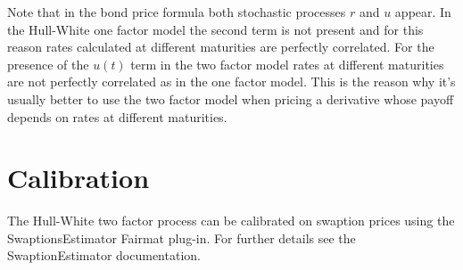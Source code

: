 Note that in the bond price formula both stochastic processes $r$ and $u$ appear. In the Hull-White one factor model the second term is not present and for this reason rates calculated at different maturities are perfectly correlated. For the presence of the $u(t)$ term in the two factor model rates at different maturities are not perfectly correlated as in the one factor model. This is the reason why it's usually better to use the two factor model when pricing a derivative whose payoff depends on rates at different maturities.

\section{Calibration}

The Hull-White two factor process can be calibrated on swaption prices using the SwaptionsEstimator Fairmat plug-in. For further details see the SwaptionEstimator documentation.





